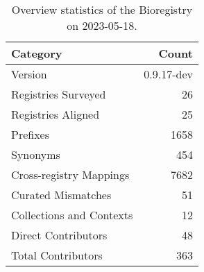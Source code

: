 \begin{table}
\caption{Overview statistics of the Bioregistry on 2023-05-18.}
\label{tab:bioregistry-summary}
\begin{tabular}{lr}
\toprule
Category & Count \\
\midrule
Version & 0.9.17-dev \\
Registries Surveyed & 26 \\
Registries Aligned & 25 \\
Prefixes & 1658 \\
Synonyms & 454 \\
Cross-registry Mappings & 7682 \\
Curated Mismatches & 51 \\
Collections and Contexts & 12 \\
Direct Contributors & 48 \\
Total Contributors & 363 \\
\bottomrule
\end{tabular}
\end{table}
